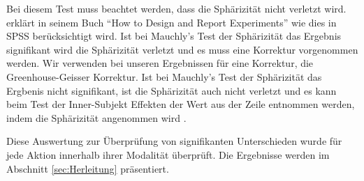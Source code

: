 Bei diesem Test muss beachtet werden, dass die Sphärizität nicht verletzt wird. 
\citet{field2002design} erklärt in seinem Buch "`How to Design and Report Experiments"' wie dies in SPSS berücksichtigt wird. 
Ist bei Mauchly's Test der Sphärizität das Ergebnis signifikant wird die Sphärizität verletzt und es muss eine Korrektur vorgenommen werden. 
Wir verwenden bei unseren Ergebnissen für eine Korrektur, die Greenhouse-Geisser Korrektur. 
Ist bei Mauchly's Test der Sphärizität das Ergbenis nicht signifikant, ist die Sphärizität auch nicht verletzt und es kann beim Test der Inner-Subjekt Effekten der Wert aus der Zeile entnommen werden, indem die Sphärizität angenommen wird \citep{field2002design}.

Diese Auswertung zur Überprüfung von signifikanten Unterschieden wurde für jede Aktion innerhalb ihrer Modalität überprüft. 
Die Ergebnisse werden im Abschnitt \ref{sec:Herleitung} präsentiert.
